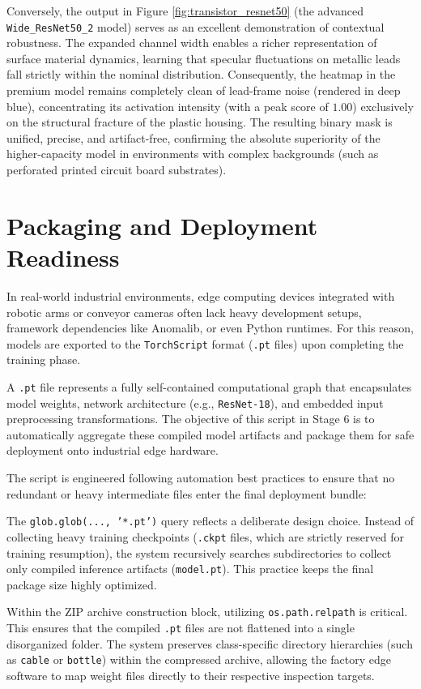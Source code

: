 \documentclass{article}
\begin{document}
Conversely, the output in Figure \ref{fig:transistor_resnet50} (the advanced \texttt{Wide\_ResNet50\_2} model) serves as an excellent demonstration of contextual robustness. The expanded channel width enables a richer representation of surface material dynamics, learning that specular fluctuations on metallic leads fall strictly within the nominal distribution. Consequently, the heatmap in the premium model remains completely clean of lead-frame noise (rendered in deep blue), concentrating its activation intensity (with a peak score of $1.00$) exclusively on the structural fracture of the plastic housing. The resulting binary mask is unified, precise, and artifact-free, confirming the absolute superiority of the higher-capacity model in environments with complex backgrounds (such as perforated printed circuit board substrates).

\section{Packaging and Deployment Readiness}

In real-world industrial environments, edge computing devices integrated with robotic arms or conveyor cameras often lack heavy development setups, framework dependencies like Anomalib, or even Python runtimes. For this reason, models are exported to the \texttt{TorchScript} format (\texttt{.pt} files) upon completing the training phase.

A \texttt{.pt} file represents a fully self-contained computational graph that encapsulates model weights, network architecture (e.g., \texttt{ResNet-18}), and embedded input preprocessing transformations. The objective of this script in Stage 6 is to automatically aggregate these compiled model artifacts and package them for safe deployment onto industrial edge hardware.

The script is engineered following automation best practices to ensure that no redundant or heavy intermediate files enter the final deployment bundle:

The \texttt{glob.glob(..., '*.pt')} query reflects a deliberate design choice. Instead of collecting heavy training checkpoints (\texttt{.ckpt} files, which are strictly reserved for training resumption), the system recursively searches subdirectories to collect only compiled inference artifacts (\texttt{model.pt}). This practice keeps the final package size highly optimized.

Within the ZIP archive construction block, utilizing \texttt{os.path.relpath} is critical. This ensures that the compiled \texttt{.pt} files are not flattened into a single disorganized folder. The system preserves class-specific directory hierarchies (such as \texttt{cable} or \texttt{bottle}) within the compressed archive, allowing the factory edge software to map weight files directly to their respective inspection targets.
\end{document}
